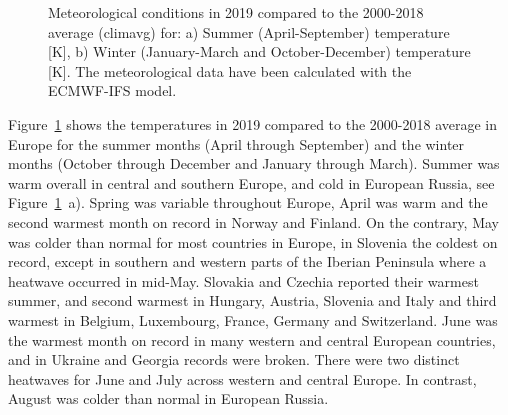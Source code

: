 \begin{figure}[h]
  \caption{Meteorological conditions in 2019 compared to the 2000-2018 average (climavg) for: a) Summer (April-September) temperature [K], b) Winter (January-March and October-December) temperature [K]. The meteorological data have been calculated with the ECMWF-IFS model.} 
\label{fig:temp-avMET}
\end{figure}

Figure~\ref{fig:temp-avMET} shows the temperatures in 2019 compared to the 2000-2018 average in Europe for the summer months (April through September) and the winter months (October through December and January through March). Summer was warm overall in central and southern Europe, and cold in European Russia, see Figure~\ref{fig:temp-avMET}~a). Spring was variable throughout Europe, April was warm and the second warmest month on record in Norway and Finland. On the contrary, May was colder than normal for most countries in Europe, in Slovenia the coldest on record, except in southern and western parts of the Iberian Peninsula where a heatwave occurred in mid-May. Slovakia and Czechia reported their warmest summer, and second warmest in Hungary, Austria, Slovenia and Italy and third warmest in Belgium, Luxembourg, France, Germany and Switzerland. June was the warmest month on record in many western and central European countries, and in Ukraine and Georgia records were broken. There were two distinct heatwaves for June and July across western and central Europe. In contrast, August was colder than normal in European Russia.

